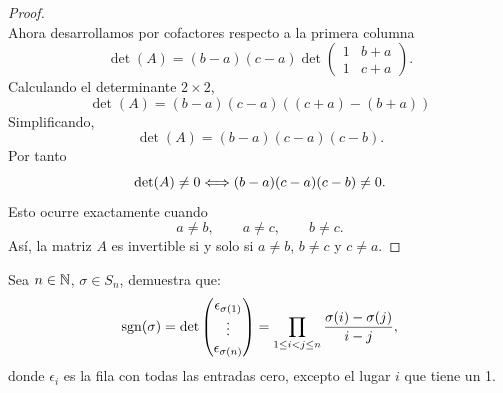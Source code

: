 \documentclass[12pt,a4paper]{article}
\begin{document}
\begin{proof}
\begin{equation*}
        \end{equation*}
        Ahora desarrollamos por cofactores respecto a la primera columna
        \begin{equation*}
            \det(A)=(b-a)(c-a)\det
            \begin{pmatrix}
                1 & b+a\\
                1 & c+a
            \end{pmatrix}.
        \end{equation*}
        Calculando el determinante $2\times2$,
        \begin{equation*}
            \det(A)=(b-a)(c-a)((c+a)-(b+a))
        \end{equation*}
        Simplificando,
        \begin{equation*}
            \det(A)=(b-a)(c-a)(c-b).
        \end{equation*}
        Por tanto
        \begin{equation*}
            \det(A)\neq0\Longleftrightarrow(b-a)(c-a)(c-b)\neq0.
        \end{equation*}
        Esto ocurre exactamente cuando
        \begin{equation*}
            a\neq b,\qquad a\neq c,\qquad b\neq c.
        \end{equation*}
        Así, la matriz $A$ es invertible si y solo si $a\neq b$, $b\neq c$ y $c\neq a$.
    \end{proof}

    \begin{mdframed}[style=mdpinkbox,frametitle={Ejercicio 5}]
        Sea $n\in\mathbb{N}$, $\sigma\in S_{n}$, demuestra que:
        \begin{equation*}
            \operatorname{sgn}(\sigma)=\det
            \begin{pmatrix}
                \epsilon_{\sigma(1)}\\
                \vdots\\
                \epsilon_{\sigma(n)}
            \end{pmatrix}
            =\prod_{1\leq i< j\leq n}\frac{\sigma(i)-\sigma(j)}{i-j},
        \end{equation*}
        donde $\epsilon_{i}$ es la fila con todas las entradas cero, excepto el lugar $i$
        que tiene un 1. 
    \end{mdframed}
\end{document}
